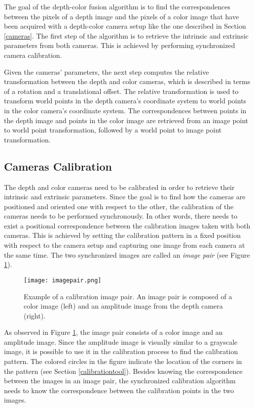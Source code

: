 The goal of the depth-color fusion algorithm is to find the correspondences between the pixels of a depth 
image and the pixels of a color image that have been acquired with a depth-color camera setup like the one 
described in Section \ref{cameras}. The first step of the algorithm is to retrieve the intrinsic and extrinsic 
parameters from both cameras. This is achieved by performing synchronized camera calibration. 

Given the cameras' parameters, the next step computes the relative transformation between the depth 
and color cameras, which is described in terms of a rotation and a translational offset. The relative 
transformation is used to transform world points in the depth camera's coordinate system to world points in
the color camera's coordinate system. The correspondences between points in the depth image and points 
in the color image are retrieved from an image point to world point transformation, followed by a world point 
to image point transformation.


\subsection{Cameras Calibration} \label{camerascalibration}


The depth and color cameras need to be calibrated in order to retrieve their intrinsic and extrinsic 
parameters. Since the goal is to find how the cameras are positioned and oriented one with respect to the 
other, the calibration of the cameras needs to be performed synchronously. In other words, there needs
to exist a positional correspondence between the calibration images taken with both cameras. This is 
achieved by setting the calibration pattern in a fixed position with respect to the camera setup and capturing 
one image from each camera at the same time. The two synchronized images are called an 
\textit{image pair} (see Figure \ref{imagepair}). 

\begin{figure}[t]
	\center
	\texttt{[image: imagepair.png]}
	\caption[Example of a calibration image pair]{Example of a calibration image pair. An image pair is 
	composed of a color image (left) and an amplitude image from the depth camera (right).}
	\label{imagepair}
\end{figure}

As observed in Figure \ref{imagepair}, the image pair consists of a color image and an amplitude image. 
Since the amplitude image is visually similar to a grayscale image, it is possible to use it in the calibration 
process to find the calibration pattern. The colored circles in the figure indicate the location of the corners
in the pattern (see Section \ref{calibrationtool}). Besides knowing the correspondence between the images 
in an image pair, the synchronized calibration algorithm needs to know the correspondence between the 
calibration points in the two images.

